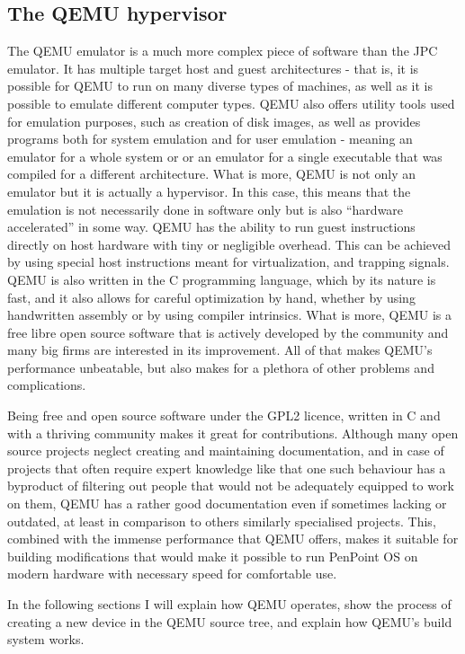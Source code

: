 \subsection{The QEMU hypervisor}

The QEMU emulator is a much more complex piece of software than the JPC
emulator. It has multiple target host and guest architectures - that is, it is
possible for QEMU to run on many diverse types of machines, as well as it is
possible to emulate different computer types. QEMU also offers utility tools
used for emulation purposes, such as creation of disk images, as well as provides
programs both for system emulation and for user emulation - meaning an emulator
for a whole system or or an emulator for a single executable that was compiled
for a different architecture. What is more, QEMU is not only an emulator but it
is actually a hypervisor. In this case, this means that the emulation is not
necessarily done in software only but is also ``hardware accelerated'' in some
way. QEMU has the ability to run guest instructions directly on host hardware
with tiny or negligible overhead.  This can be achieved by using special host
instructions meant for virtualization, and trapping signals. QEMU is also
written in the C programming language, which by its nature is fast, and it also
allows for careful optimization by hand, whether by using handwritten assembly or
by using compiler intrinsics. What is more, QEMU is a free libre open source
software that is actively developed by the community and many big firms are
interested in its improvement. All of that makes QEMU's performance unbeatable,
but also makes for a plethora of other problems and complications.

Being free and open source software under the GPL2 licence, written in C and
with a thriving community makes it great for contributions. Although many open
source projects neglect creating and maintaining documentation, and in case of
projects that often require expert knowledge like that one such behaviour has
a byproduct of filtering out people that would not be adequately equipped to
work on them, QEMU has a rather good documentation even if sometimes lacking or
outdated, at least in comparison to others similarly specialised projects. This,
combined with the immense performance that QEMU offers, makes it suitable for
building modifications that would make it possible to run PenPoint OS on modern
hardware with necessary speed for comfortable use.

In the following sections I will explain how QEMU operates, show the process of
creating a new device in the QEMU source tree, and explain how QEMU's build
system works.

